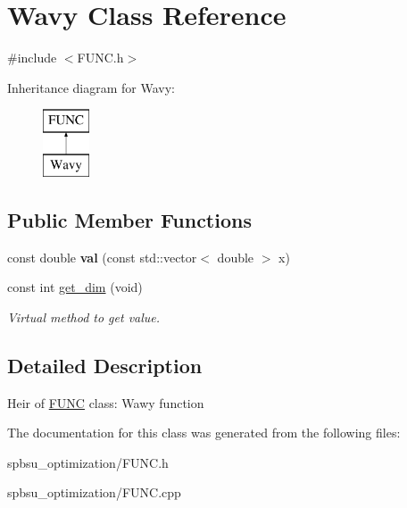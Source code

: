 \hypertarget{class_wavy}{}\section{Wavy Class Reference}
\label{class_wavy}


{\ttfamily \#include $<$F\+U\+N\+C.\+h$>$}

Inheritance diagram for Wavy\+:\begin{figure}[H]
\begin{center}
\leavevmode
\includegraphics[height=2.000000cm]{class_wavy}
\end{center}
\end{figure}
\subsection*{Public Member Functions}
\begin{DoxyCompactItemize}
\item 
\mbox{\label{class_wavy_aec7d22802ab0b2e833f92712266b274c}} 
const double {\bfseries val} (const std\+::vector$<$ double $>$ x)
\item 
\mbox{\label{class_wavy_a89817549d743f397812e0c5407f2f3a3}} 
const int \hyperlink{class_wavy_a89817549d743f397812e0c5407f2f3a3}{get\+\_\+dim} (void)
\begin{DoxyCompactList}\small\item\em Virtual method to get value. \end{DoxyCompactList}\end{DoxyCompactItemize}


\subsection{Detailed Description}
Heir of \hyperlink{class_f_u_n_c}{F\+U\+NC} class\+: Wawy function 

The documentation for this class was generated from the following files\+:\begin{DoxyCompactItemize}
\item 
spbsu\+\_\+optimization/F\+U\+N\+C.\+h\item 
spbsu\+\_\+optimization/F\+U\+N\+C.\+cpp\end{DoxyCompactItemize}
